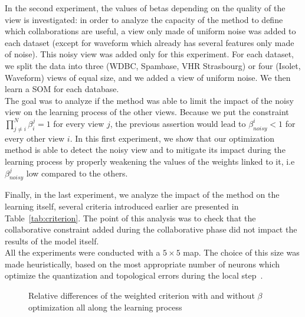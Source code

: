 In the second experiment, the values of betas depending on the quality of the view is investigated: in order to analyze the capacity of the method to define which collaborations are useful, a view only made of uniform noise was added to each dataset (except for waveform which already has several features only made of noise). This noisy view was added only for this experiment.
For each dataset, we split the data into three (WDBC, Spambase, VHR Strasbourg) or four (Isolet, Waveform) views of equal size, and we added a view of uniform noise. We then learn a SOM for each database. \\
The goal was to analyze if the method was able to limit the impact of the noisy view on the learning process of the other views. Because we put the constraint $\prod_{j \neq i}^N \beta^j_i = 1$ for every view $j$, the previous assertion would lead to $\beta_{noisy}^i < 1$ for every other view $i$. In this first experiment, we show that our optimization method is able to detect the noisy view and to mitigate its impact during the learning process by properly weakening the values of the weights linked to it, i.e $\beta_{noisy}^j$ low compared to the others.


Finally, in the last experiment, we analyze the impact of the method on the learning itself, several criteria introduced earlier are presented in Table~\ref{tab:criterion}. The point of this analysis was to check that the collaborative constraint added during the collaborative phase did not impact the results of the model itself. \\

 

All the experiments were conducted with a $5\times5$ map. 
The choice of this size was made heuristically, based on the most appropriate number of neurons which optimize the quantization and topological errors during the local step~\cite{grozavu2010topological}.


\begin{figure}[!h]
	\centering

    \centering
	\caption{Relative differences of the weighted criterion with and without $\beta$ optimization all along the learning process}
\label{fig:relative_difference}
\end{figure}

